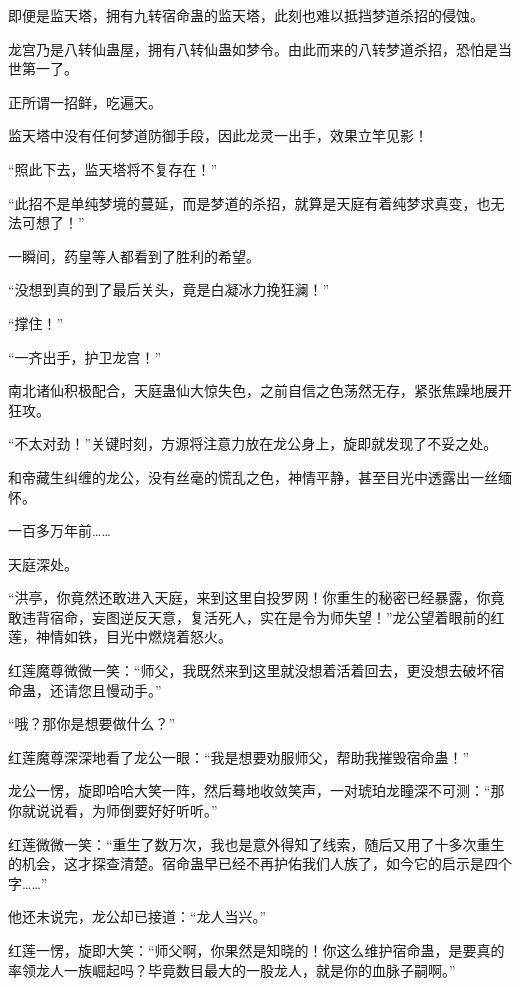 
\begin{this_body}

即便是监天塔，拥有九转宿命蛊的监天塔，此刻也难以抵挡梦道杀招的侵蚀。

龙宫乃是八转仙蛊屋，拥有八转仙蛊如梦令。由此而来的八转梦道杀招，恐怕是当世第一了。

正所谓一招鲜，吃遍天。

监天塔中没有任何梦道防御手段，因此龙灵一出手，效果立竿见影！

“照此下去，监天塔将不复存在！”

“此招不是单纯梦境的蔓延，而是梦道的杀招，就算是天庭有着纯梦求真变，也无法可想了！”

一瞬间，药皇等人都看到了胜利的希望。

“没想到真的到了最后关头，竟是白凝冰力挽狂澜！”

“撑住！”

“一齐出手，护卫龙宫！”

南北诸仙积极配合，天庭蛊仙大惊失色，之前自信之色荡然无存，紧张焦躁地展开狂攻。

“不太对劲！”关键时刻，方源将注意力放在龙公身上，旋即就发现了不妥之处。

和帝藏生纠缠的龙公，没有丝毫的慌乱之色，神情平静，甚至目光中透露出一丝缅怀。

一百多万年前……

天庭深处。

“洪亭，你竟然还敢进入天庭，来到这里自投罗网！你重生的秘密已经暴露，你竟敢违背宿命，妄图逆反天意，复活死人，实在是令为师失望！”龙公望着眼前的红莲，神情如铁，目光中燃烧着怒火。

红莲魔尊微微一笑：“师父，我既然来到这里就没想着活着回去，更没想去破坏宿命蛊，还请您且慢动手。”

“哦？那你是想要做什么？”

红莲魔尊深深地看了龙公一眼：“我是想要劝服师父，帮助我摧毁宿命蛊！”

龙公一愣，旋即哈哈大笑一阵，然后蓦地收敛笑声，一对琥珀龙瞳深不可测：“那你就说说看，为师倒要好好听听。”

红莲微微一笑：“重生了数万次，我也是意外得知了线索，随后又用了十多次重生的机会，这才探查清楚。宿命蛊早已经不再护佑我们人族了，如今它的启示是四个字……”

他还未说完，龙公却已接道：“龙人当兴。”

红莲一愣，旋即大笑：“师父啊，你果然是知晓的！你这么维护宿命蛊，是要真的率领龙人一族崛起吗？毕竟数目最大的一股龙人，就是你的血脉子嗣啊。”


\end{this_body}
